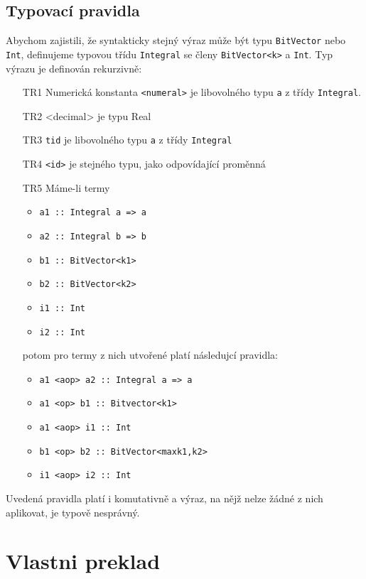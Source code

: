 \documentclass[12pt]{fithesis2}
\begin{document}
\subsection{Typovací pravidla}
Abychom zajistili, že syntakticky stejný výraz může být typu \texttt{BitVector} nebo \texttt{Int}, definujeme typovou třídu \texttt{Integral} se členy \texttt{BitVector<k>} a \texttt{Int}. Typ výrazu je definován rekurzivně:
\begin{enumerate}
\item[TR1] Numerická konstanta \texttt{<numeral>} je libovolného typu \texttt{a} z třídy \texttt{Integral}.
\item[TR2] <decimal> je typu Real
\item[TR3] \texttt{tid} je libovolného typu \texttt{a} z třídy \texttt{Integral}
\item[TR4] \texttt{<id>} je stejného typu, jako odpovídající proměnná
\item[TR5] Máme-li termy
	\begin{itemize}
	\item \texttt{a1 :: Integral a => a}
	\item \texttt{a2 :: Integral b => b}
	\item \texttt{b1 :: BitVector<k1>}
	\item \texttt{b2 :: BitVector<k2>}
	\item \texttt{i1 :: Int}
	\item \texttt{i2 :: Int}
	\end{itemize}
	potom pro termy z nich utvořené platí následujcí pravidla:
	\begin{itemize}
	\item \texttt{a1 <aop> a2 :: Integral a => a}
	\item \texttt{a1 <op>  b1 :: Bitvector<k1>}
	\item \texttt{a1 <aop> i1 :: Int}
	\item \texttt{b1 <op>  b2 :: BitVector<max{k1,k2}>}
	\item \texttt{i1 <aop> i2 :: Int}
	\end{itemize}
\end{enumerate}
Uvedená pravidla platí i komutativně a výraz, na nějž nelze žádné z nich aplikovat, je typově nesprávný.


\section{Vlastni preklad}
\end{document}
